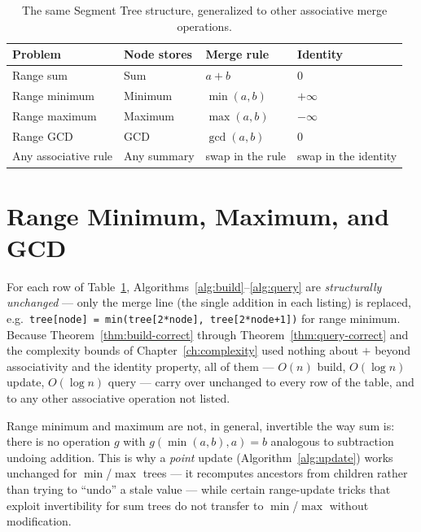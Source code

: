 \documentclass[
  11pt,
  a4paper,
  twoside=false,
  numbers=noenddot,
  headings=big,
  parskip=half,
  toc=bibliography,
  toc=listof,
  bibliography=totoc
]{scrreprt}
\newcommand{\Oh}[1]{O\!\left(#1\right)}
\newcommand{\tblhead}[1]{\textbf{\sffamily #1}}
\begin{document}
\begin{table}[h]
\centering
\caption{The same Segment Tree structure, generalized to other associative merge operations.}
\label{tab:generalization}
\begin{tabular}{llll}
\toprule
\tblhead{Problem} & \tblhead{Node stores} & \tblhead{Merge rule} & \tblhead{Identity} \\
\midrule
Range sum      & Sum      & $a+b$         & $0$ \\
Range minimum  & Minimum  & $\min(a,b)$   & $+\infty$ \\
Range maximum  & Maximum  & $\max(a,b)$   & $-\infty$ \\
Range GCD      & GCD      & $\gcd(a,b)$   & $0$ \\
\rowcolor{lightblue!30}
Any associative rule & Any summary & swap in the rule & swap in the identity \\
\bottomrule
\end{tabular}
\end{table}

\section{Range Minimum, Maximum, and GCD}
For each row of Table~\ref{tab:generalization}, Algorithms~\ref{alg:build}--\ref{alg:query} are \emph{structurally unchanged} --- only the merge line (the single addition in each listing) is replaced, e.g.\ \texttt{tree[node] = min(tree[2*node], tree[2*node+1])} for range minimum. Because Theorem~\ref{thm:build-correct} through Theorem~\ref{thm:query-correct} and the complexity bounds of Chapter~\ref{ch:complexity} used nothing about $+$ beyond associativity and the identity property, all of them --- $\Oh{n}$ build, $\Oh{\log n}$ update, $\Oh{\log n}$ query --- carry over unchanged to every row of the table, and to any other associative operation not listed.

\begin{remark}
Range minimum and maximum are not, in general, invertible the way sum is: there is no operation $g$ with $g(\min(a,b),a)=b$ analogous to subtraction undoing addition. This is why a \emph{point} update (Algorithm~\ref{alg:update}) works unchanged for $\min$/$\max$ trees --- it recomputes ancestors from children rather than trying to ``undo'' a stale value --- while certain range-update tricks that exploit invertibility for sum trees do not transfer to $\min$/$\max$ without modification.
\end{remark}
\end{document}
